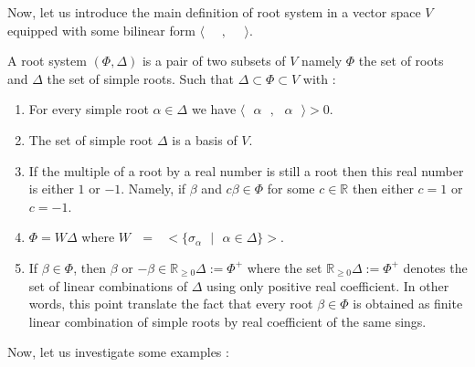 \documentclass[envcountsame,envcountchap]{svmono}
\newcommand{\R}{\mathbb R}
\newcommand{\sub}{\subset}
\newcommand{\prods}[2]{\langle\qq #1\qq,\qq#2\qq\rangle}
\newcommand{\qq}{\text{ }}
\begin{document}
Now, let us introduce the main definition of root system in a vector space $V$ equipped with some bilinear form $\prods{}{}$.
\begin{definition}
	A root system $(\Phi,\Delta)$ is a pair of two subsets of $V$ namely $\Phi$ the set of roots and $\Delta$ the set of simple roots. Such that $\Delta\sub \Phi\sub V$ with :
	\begin{enumerate}[({R}1)]
		\item For every simple root $\alpha\in \Delta$ we have $\prods{\alpha}{\alpha}>0$.
		\item The set of simple root $\Delta$ is a basis of $V$.
		\item If the multiple of a root by a real number is still a root then this real number is either $1$ or $-1$. Namely, if $\beta$ and $c\beta\in \Phi$ for some $c\in \R$ then either $c=1$ or $c=-1$.
		\item $\Phi=W\Delta$ where $W\qq=\qq <\{\sigma_\alpha\qq \lvert\qq \alpha\in \Delta\}>$.
		\item If $\beta\in \Phi$, then $\beta$ or $-\beta\in \R_{\geq 0}\Delta:=\Phi^+$ where the set $\R_{\geq 0}\Delta:=\Phi^+$ denotes the set of linear combinations of $\Delta$ using only positive real coefficient. In other words, this point translate the fact that every root $\beta\in \Phi$ is obtained as finite linear combination of simple roots by real coefficient of the same sings.  
	\end{enumerate}
\end{definition}
Now, let us investigate some examples :
\end{document}
